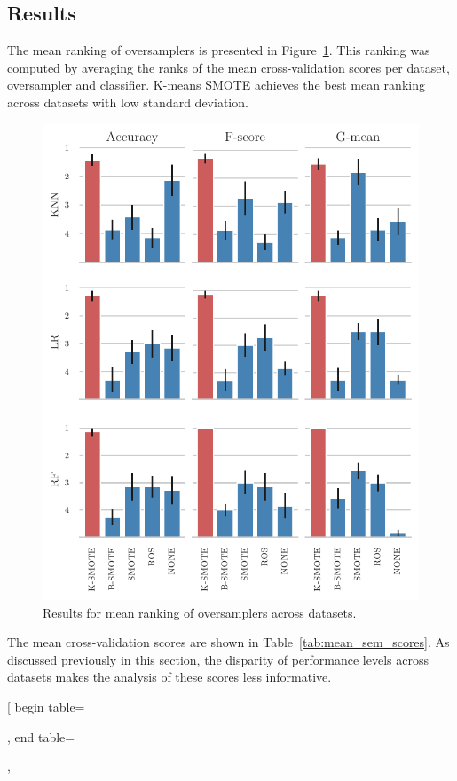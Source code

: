 \documentclass[information,article,submit,moreauthors,pdftex]{Definitions/mdpi}
\begin{document}
\begin{paracol}{2}
\subsection{Results}

The mean ranking of oversamplers is presented in
Figure~\ref{fig:mean_sem_ranking}. This ranking was computed by averaging the
ranks of the mean cross-validation scores per dataset, oversampler and
classifier. K-means SMOTE achieves the best mean ranking across datasets with
low standard deviation.


\end{paracol}
\begin{figure}[ht]
    \widefigure
    \captionsetup{justification=centering}
	\caption{
    	Results for mean ranking of oversamplers across datasets.
    \vspace{.2cm}}
	\label{fig:mean_sem_ranking}
	\includegraphics[width=.65\linewidth]{../analysis/mean_rankings_bar_chart}
\end{figure}
\begin{paracol}{2}
\linenumbers
\switchcolumn

The mean cross-validation scores are shown in Table~\ref{tab:mean_sem_scores}.
As discussed previously in this section, the disparity of performance levels
across datasets makes the analysis of these scores less informative.

\end{paracol}
\captionsetup{justification=centering}
\pgfplotstabletypeset[
	begin table=\begin{longtable},
	end table=\end{longtable},
\end{document}
